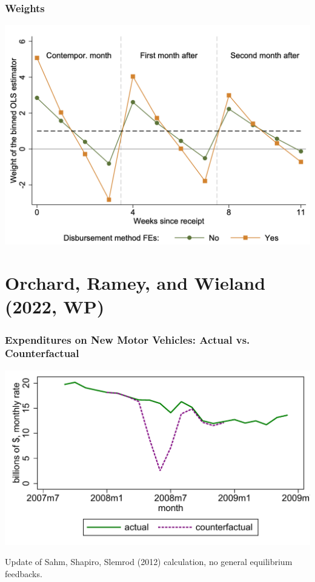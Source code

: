 \documentclass[english,xcolor=svgnames]{beamer}
\begin{document}
\begin{frame}
\frametitle[alignment=center]{Weights}
\centering
\includegraphics[scale=0.5]{figures/BJSFIG3.png}
\end{frame}

\section{Orchard, Ramey, and Wieland (2022, WP)}

\begin{frame}{}
\frametitle{Expenditures on New Motor Vehicles: Actual vs. Counterfactual}

\begin{center}
\includegraphics[scale=.6]{figures/fig_sss_mv_counter.pdf}
 \end{center} 
{\footnotesize Update of Sahm, Shapiro, Slemrod (2012) calculation, no general equilibrium feedbacks.}
\end{frame}
\end{document}
